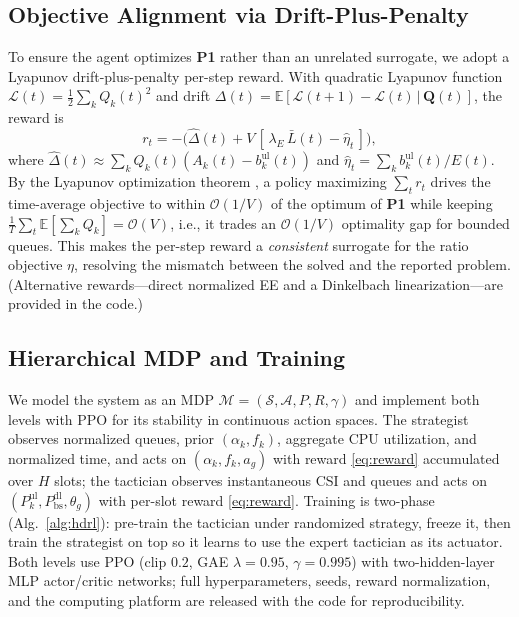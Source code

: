 \documentclass[conference]{IEEEtran}
\newcommand{\E}{\mathbb{E}}
\begin{document}
\subsection{Objective Alignment via Drift-Plus-Penalty}\label{sec:obj}
To ensure the agent optimizes \textbf{P1} rather than an unrelated surrogate, we
adopt a Lyapunov drift-plus-penalty per-step reward. With quadratic Lyapunov function
$\mathcal{L}(t)=\tfrac12\sum_k Q_k(t)^2$ and drift
$\Delta(t)=\E[\mathcal{L}(t{+}1)-\mathcal{L}(t)\,|\,\mathbf{Q}(t)]$, the reward is
\begin{equation}
r_t=-\big(\hat\Delta(t)+V\,[\,\lambda_E\,\bar L(t)-\hat\eta_t\,]\big),
\label{eq:reward}
\end{equation}
where $\hat\Delta(t)\!\approx\!\sum_k Q_k(t)(A_k(t)-b_k^{\mathrm{ul}}(t))$ and
$\hat\eta_t=\sum_k b_k^{\mathrm{ul}}(t)/E(t)$. By the Lyapunov optimization theorem
\cite{neely2010stochastic}, a policy maximizing $\sum_t r_t$ drives the time-average
objective to within $\mathcal{O}(1/V)$ of the optimum of \textbf{P1} while keeping
$\tfrac1T\sum_t\E[\sum_k Q_k]=\mathcal{O}(V)$, i.e., it trades an $\mathcal{O}(1/V)$
optimality gap for bounded queues. This makes the per-step reward a
\emph{consistent} surrogate for the ratio objective $\eta$, resolving the mismatch
between the solved and the reported problem. (Alternative rewards---direct normalized
EE and a Dinkelbach linearization---are provided in the code.)

\subsection{Hierarchical MDP and Training}
We model the system as an MDP $\mathcal{M}=(\mathcal{S},\mathcal{A},P,R,\gamma)$ and
implement both levels with PPO for its stability in continuous action spaces. The
strategist observes normalized queues, prior $(\alpha_k,f_k)$, aggregate CPU
utilization, and normalized time, and acts on $(\alpha_k,f_k,a_g)$ with reward
\eqref{eq:reward} accumulated over $H$ slots; the tactician observes instantaneous
CSI and queues and acts on $(P_k^{\mathrm{ul}},P_{\mathrm{bs}}^{\mathrm{dl}},\theta_g)$
with per-slot reward \eqref{eq:reward}. Training is two-phase (Alg.~\ref{alg:hdrl}):
pre-train the tactician under randomized strategy, freeze it, then train the
strategist on top so it learns to use the expert tactician as its actuator. Both
levels use PPO (clip $0.2$, GAE $\lambda{=}0.95$, $\gamma{=}0.995$) with two-hidden-layer
MLP actor/critic networks; full hyperparameters, seeds, reward normalization, and the
computing platform are released with the code for reproducibility.
\end{document}
